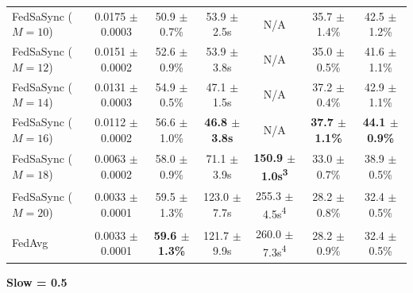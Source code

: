 \begin{table}[t]
{\begin{tabular}{lcccccc}
FedSaSync ($M = 10$) & 0.0175 $\pm$ 0.0003 & 50.9 $\pm$ 0.7\% & 53.9 $\pm$ 2.5s & N/A & 35.7 $\pm$ 1.4\% & 42.5 $\pm$ 1.2\% \\
FedSaSync ($M = 12$) & 0.0151 $\pm$ 0.0002 & 52.6 $\pm$ 0.9\% & 53.9 $\pm$ 3.8s & N/A & 35.0 $\pm$ 0.5\% & 41.6 $\pm$ 1.1\% \\
FedSaSync ($M = 14$) & 0.0131 $\pm$ 0.0003 & 54.9 $\pm$ 0.5\% & 47.1 $\pm$ 1.5s & N/A & 37.2 $\pm$ 0.4\% & 42.9 $\pm$ 1.1\% \\
FedSaSync ($M = 16$) & 0.0112 $\pm$ 0.0002 & 56.6 $\pm$ 1.0\% & \textbf{46.8 $\pm$ 3.8s} & N/A & \textbf{37.7 $\pm$ 1.1\%} & \textbf{44.1 $\pm$ 0.9\%} \\
FedSaSync ($M = 18$) & 0.0063 $\pm$ 0.0002 & 58.0 $\pm$ 0.9\% & 71.1 $\pm$ 3.9s & \textbf{150.9 $\pm$ 1.0s\textsuperscript{3}} & 33.0 $\pm$ 0.7\% & 38.9 $\pm$ 0.5\% \\
FedSaSync ($M = 20$) & 0.0033 $\pm$ 0.0001 & 59.5 $\pm$ 1.3\% & 123.0 $\pm$ 7.7s & 255.3 $\pm$ 4.5s\textsuperscript{4} & 28.2 $\pm$ 0.8\% & 32.4 $\pm$ 0.5\% \\
FedAvg & 0.0033 $\pm$ 0.0001 & \textbf{59.6 $\pm$ 1.3\%} & 121.7 $\pm$ 9.9s & 260.0 $\pm$ 7.3s\textsuperscript{4} & 28.2 $\pm$ 0.9\% & 32.4 $\pm$ 0.5\% \\
\hline
\end{tabular}%
}
\par\vspace{0.8em}
\noindent\textbf{Slow = 0.5} \\[0.2em]
\end{table}
